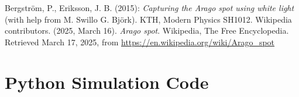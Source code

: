 \documentclass[11pt,a4paper]{article}
\begin{document}

\newpage

\begin{thebibliography}{99}
Bergström, P., Eriksson, J. B. (2015): \textit{Capturing the Arago spot using white light} (with help from M. Swillo G. Björk). KTH, Modern Physics SH1012.
Wikipedia contributors. (2025, March 16). \textit{Arago spot}. Wikipedia, The Free Encyclopedia. Retrieved March 17, 2025, from \url{https://en.wikipedia.org/wiki/Arago_spot}
\end{thebibliography}

\appendix
\section{Python Simulation Code}
\inputminted[linenos,breaklines,frame=single]{python}{images/code.py}
\end{document}
